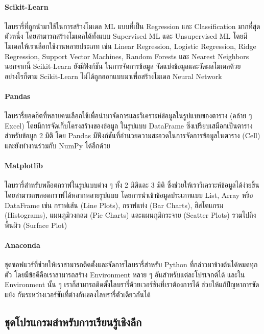 \paragraph{Scikit-Learn}
ไลบรารี่ที่ถูกนำมาใช้ในการสร้างโมเดล ML แบบที่เป็น Regression และ Classification มากที่สุดตัวหนึ่ง โดยสามารถสร้างโมเดลได้ทั้งแบบ 
Supervised ML และ Unsupervised ML โดยมีโมเดลให้เราเลือกใช้งานหลายประเภท เช่น Linear Regression, Logistic Regression, 
Ridge Regression, Support Vector Machines, Random Forests และ Nearest Neighbors นอกจากนี้ Scikit-Learn ยังมีฟังก์ชัน%
ในการจัดการข้อมูล จัดแบ่งข้อมูลและวัดผลโมเดลด้วย อย่างไรก็ตาม Scikit-Learn ไม่ได้ถูกออกแบบมาเพื่อสร้างโมเดล Neural Network

\paragraph{Pandas}
ไลบรารี่ยอดฮิตที่หลายคนเลือกใช้เพื่อนำมาจัดการและวิเคราะห์ข้อมูลในรูปแบบของตาราง (คล้าย ๆ Excel) โดยมีการจัดเก็บโครงสร้างของข้อมูล%
ในรูปแบบ DataFrame ซึ่งเปรียบเสมือกเป็นตารางสำหรับข้อมูล 2 มิติ โดย Pandas มีฟังก์ชันที่อำนวยความสะอวดในการจัดการข้อมูลในตาราง (Cell) 
และยังทำงานร่วมกับ NumPy ได้อีกด้วย

\paragraph{Matplotlib}
ไลบรารี่สำหรับพล็อตกราฟในรูปแบบต่าง ๆ ทั้ง 2 มิติและ 3 มิติ ซึ่งช่วยให้เราวิเคราะห์ข้อมูลได้ง่ายขึ้น โดยสามารถพลอตกราฟได้หลากหลายรูปแบบ%
โดยการนำเข้าข้อมูลประเภทแบบ List, Array หรือ DataFrame เช่น กราฟเส้น (Line Plots), กราฟแท่ง (Bar Charts), ฮิสโตแกรม 
(Histograms), แผนภูมิวงกลม (Pie Charts) และแผนภูมิกระจาย (Scatter Plots) รวมไปถึงพื้นผิว (Surface Plot)

\paragraph{Anaconda}
ชุดซอฟแวร์ที่ช่วยให้เราสามารถติดตั้งและจัดการไลบรารี่สำหรับ Python ที่กล่าวมาข้างต้นได้หมดทุกตัว โดยมีข้อดีคือเราสามารถสร้าง Environment 
หลาย ๆ อันสำหรับแต่ละโปรเจกต์ได้ และใน Environment นั้น ๆ เราก็สามารถติดตั้งไลบรารี่ด้วยเวอร์ชันที่เราต้องการได้ ช่วยให้แก้ปัญหาการขัดแย้ง%
กันระหว่างเวอร์ชันที่ต่างกันของไลบรารี่ตัวเดียวกันได้

\subsection{ชุดโปรแกรมสำหรับการเรียนรู้เชิงลึก}

